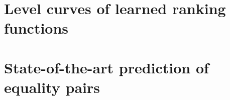 \documentclass{article}
\begin{document}
\section*{Level curves of learned ranking functions}



\section*{State-of-the-art prediction of equality pairs}




\end{document}
